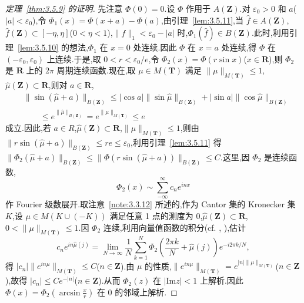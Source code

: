 \begin{proof}[定理~\ref{thm:3.5.9} 的证明]
先注意 $\Phi(0) = 0$.设 $\Phi$ 作用于 $A(\mathbf{Z})$.对 $\varepsilon_{0} > 0$ 和 $a$($|a| < \varepsilon_{0}$),令 $\Phi_{1}(x) = \Phi(x + a) - \Phi(a)$,由引理~\ref{lem:3.5.11},当 $\widehat{f} \in A(\mathbf{Z})$,$\widehat{f}(\mathbf{Z}) \subset [-\eta, \eta]$($0 < \eta < 1$),$\|f\|_{1} < \varepsilon_{0} - |a|$ 时,$\Phi_{1}(\widehat{f}) \in B(\mathbf{Z})$.此时,利用引理~\ref{lem:3.5.10} 的想法,$\Phi_{1}$ 在 $x = 0$ 处连续.因此 $\Phi$ 在 $x = a$ 处连续,得 $\Phi$ 在 $(-\varepsilon_{0}, \varepsilon_{0})$ 上连续.于是,取 $0 < r < \varepsilon_{0}/e$,令 $\Phi_{2}(x) = \Phi(r\sin x)$($x \in \mathbf{R}$),则 $\Phi_{2}$ 是 $\mathbf{R}$ 上的 $2\pi$ 周期连续函数.现在,取 $\mu \in M(\mathbf{T})$ 满足 $\|\mu\|_{M(\mathbf{T})} \leq 1$,$\widehat{\mu}(\mathbf{Z}) \subset \mathbf{R}$,则对 $a \in \mathbf{R}$,
\begin{align*}
&\|\sin(\widehat{\mu} + a)\|_{B(\mathbf{Z})} \leq |\cos a|\|\sin\widehat{\mu}\|_{B(\mathbf{Z})} + |\sin a|\|\cos\widehat{\mu}\|_{B(\mathbf{Z})}\\
&\qquad \leq e^{\|\widehat{\mu}\|_{B(\mathbf{Z})}} = e^{\|\mu\|_{M(\mathbf{T})}} \leq e
\end{align*}
成立.因此,若 $a \in R$,$\widehat{\mu}(\mathbf{Z}) \subset \mathbf{R}$,$\|\mu\|_{M(\mathbf{T})} \leq 1$,则由 $\|r\sin(\widehat{\mu} + a)\|_{B(\mathbf{Z})} \leq re \leq \varepsilon_{0}$,利用引理~\ref{lem:3.5.11} 得 $\|\Phi_{2}(\widehat{\mu} + a)\|_{B(\mathbf{Z})} \leq \|\Phi(r\sin(\widehat{\mu} + a))\|_{B(\mathbf{Z})} \leq C$.这里,因 $\Phi_{2}$ 是连续函数,
\begin{equation*}
\Phi_{2}(x) \sim \sum_{-\infty}^{\infty}c_{n}e^{inx}
\end{equation*}
作 Fourier 级数展开.取注意~\ref{note:3.3.12} 所述的,作为 Cantor 集的 Kronecker 集 $K$,设 $\mu \in M(K \cup (-K))$ 满足任意 1 点的测度为 0,$\widehat{\mu}(\mathbf{Z}) \subset \mathbf{R}$,$0 < \|\mu\|_{M(\mathbf{T})} \leq 1$.因 $\Phi_{2}$ 连续,利用向量值函数的积分(cf. \cite{ch3:3}, \cite{ch3:8}),估计
\begin{equation*}
c_{n}e^{in\widehat{\mu}(j)} = \lim_{N \to \infty}\frac{1}{N}\sum_{k=1}^{N}\Phi_{2}\left(\frac{2\pi k}{N} + \widehat{\mu}(j)\right)e^{-i2\pi k/N},
\end{equation*}
得 $|c_{n}|\|e^{in\mu}\|_{M(\mathbf{T})} \leq C$($n \in \mathbf{Z}$).由 $\mu$ 的性质,$\|e^{in\mu}\|_{M(\mathbf{T})} = e^{|n|\|\mu\|_{M(\mathbf{T})}}$($n \in \mathbf{Z}$),故得 $|c_{n}| \leq Ce^{-|n|}$($n \in \mathbf{Z}$).从而 $\Phi_{2}(z)$ 在 $|\mathrm{Im}z| < 1$ 上解析.因此 $\Phi(x) = \Phi_{2}\left(\arcsin\frac{x}{r}\right)$ 在 0 的邻域上解析.
\end{proof}

